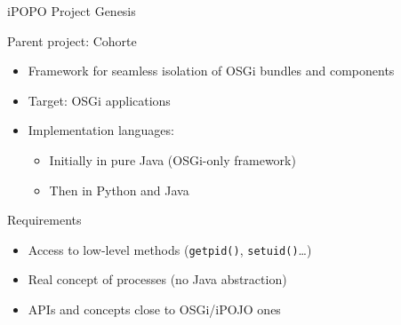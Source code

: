 \begin{frame}{iPOPO Project Genesis}
\begin{block}{Parent project: Cohorte}
\begin{itemize}
\item Framework for seamless isolation of OSGi bundles and components
\item Target: OSGi applications
\item Implementation languages:
\begin{itemize}
\item Initially in pure Java (OSGi-only framework)
\item Then in Python and Java
\end{itemize}
\end{itemize}
\end{block}

\begin{block}{Requirements}
\begin{itemize}
\item Access to low-level methods (\texttt{getpid()}, \texttt{setuid()}\ldots)
\item Real concept of processes (no Java abstraction)
\item APIs and concepts close to OSGi/iPOJO ones
\end{itemize}
\end{block}
\end{frame}

